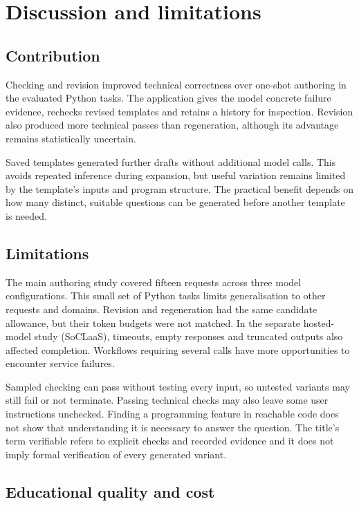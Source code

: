 \section{Discussion and limitations}\label{sec:discussion}

\subsection{Contribution}\label{sec:contribution}

Checking and revision improved technical correctness over one-shot authoring in the evaluated Python tasks. The application gives the model concrete failure evidence, rechecks revised templates and retains a history for inspection. Revision also produced more technical passes than regeneration, although its advantage remains statistically uncertain.

Saved templates generated further drafts without additional model calls. This avoids repeated inference during expansion, but useful variation remains limited by the template's inputs and program structure. The practical benefit depends on how many distinct, suitable questions can be generated before another template is needed.

\subsection{Limitations}\label{sec:limitations}

The main authoring study covered fifteen requests across three model configurations. This small set of Python tasks limits generalisation to other requests and domains. Revision and regeneration had the same candidate allowance, but their token budgets were not matched. In the separate hosted-model study (SoCLaaS), timeouts, empty responses and truncated outputs also affected completion. Workflows requiring several calls have more opportunities to encounter service failures.

Sampled checking can pass without testing every input, so untested variants may still fail or not terminate. Passing technical checks may also leave some user instructions unchecked. Finding a programming feature in reachable code does not show that understanding it is necessary to answer the question. The title's term verifiable refers to explicit checks and recorded evidence and it does not imply formal verification of every generated variant.

\subsection{Educational quality and cost}\label{sec:educational-cost}

